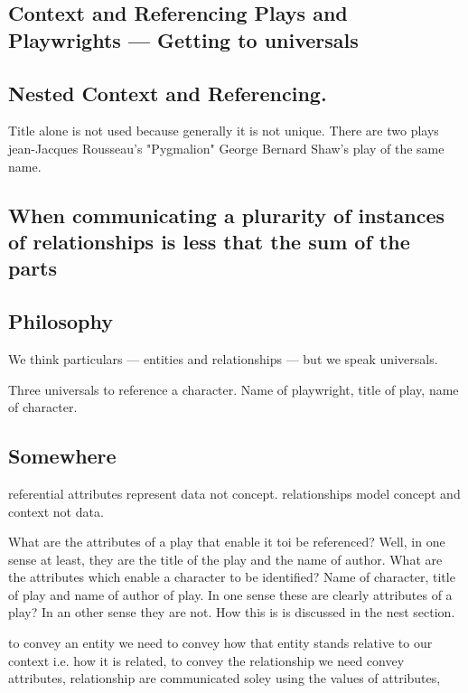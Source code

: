 \subsection{Context and Referencing Plays and Playwrights --- Getting to universals}
\newpage
\subsection{Nested Context and Referencing.}
\mynote Title alone is not used because generally it is not unique.
There are two plays jean-Jacques Rousseau's "Pygmalion"
George Bernard Shaw's play of the same name.

\subsection{When communicating a plurarity of instances of relationships is less that the sum of the parts }
\subsection{Philosophy}
We think particulars --- entities and relationships --- but we speak universals.


Three universals to reference a character. Name of playwright, title of play, name of character.

\subsection{Somewhere}
\mynote
referential attributes represent data not concept.
\mynote
relationships model concept and context not data.

\mynote What are the attributes of a play that enable it toi be referenced? Well, in one sense at least, they are the title of the play and the name of author. What are the attributes which enable a character to be identified? Name of character, title of play and name of author of play. In one sense these are clearly attributes of a play? In an other sense they are not. How this is is discussed in the nest section.  

\mynote to convey an entity we need to convey how that entity stands relative to our context i.e. how it is related,
to convey the relationship we need convey attributes,
 relationship are communicated soley using the values of attributes,
 
